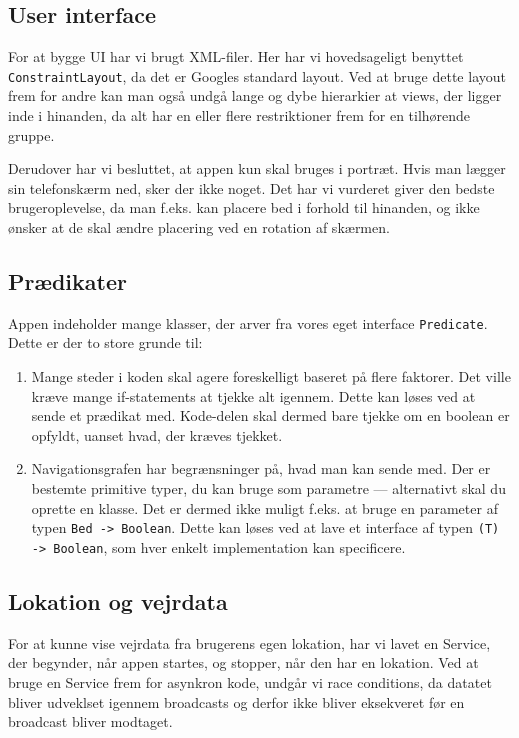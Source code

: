 \subsection{User interface}
For at bygge UI har vi brugt XML-filer. Her har vi hovedsageligt benyttet \texttt{ConstraintLayout}, da det er Googles standard layout. Ved at bruge dette layout frem for andre kan man også undgå lange og dybe hierarkier at views, der ligger inde i hinanden, da alt har en eller flere restriktioner frem for en tilhørende gruppe.

Derudover har vi besluttet, at appen kun skal bruges i portræt. Hvis man lægger sin telefonskærm ned, sker der ikke noget. Det har vi vurderet giver den bedste brugeroplevelse, da man f.eks. kan placere bed i forhold til hinanden, og ikke ønsker at de skal ændre placering ved en rotation af skærmen. 

\subsection{Prædikater}
Appen indeholder mange klasser, der arver fra vores eget interface \texttt{Predicate}. Dette er der to store grunde til:

\begin{enumerate}
    \item Mange steder i koden skal agere foreskelligt baseret på flere faktorer. Det ville kræve mange if-statements at tjekke alt igennem. Dette kan løses ved at sende et prædikat med. Kode-delen skal dermed bare tjekke om en boolean er opfyldt, uanset hvad, der kræves tjekket.
    \item Navigationsgrafen har begrænsninger på, hvad man kan sende med. Der er bestemte primitive typer, du kan bruge som parametre --- alternativt skal du oprette en klasse. Det er dermed ikke muligt f.eks. at bruge en parameter af typen \texttt{Bed -> Boolean}. Dette kan løses ved at lave et interface af typen \texttt{(T) -> Boolean}, som hver enkelt implementation kan specificere.
    
\end{enumerate}

\subsection{Lokation og vejrdata}
For at kunne vise vejrdata fra brugerens egen lokation, har vi lavet en Service, der begynder, når appen startes, og stopper, når den har en lokation. Ved at bruge en Service frem for asynkron kode, undgår vi race conditions, da datatet bliver udveklset igennem broadcasts og derfor ikke bliver eksekveret før en broadcast bliver modtaget.

